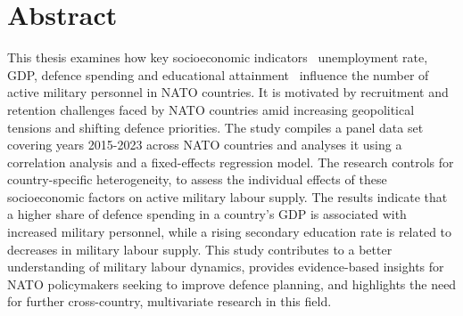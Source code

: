 \chapter*{Abstract}

This thesis examines how key socioeconomic indicators \textemdash\ unemployment rate, GDP, defence spending 
and educational attainment \textemdash\ influence the number of active military personnel in NATO countries.
It is motivated by recruitment and retention challenges faced by NATO countries
amid increasing geopolitical tensions and shifting defence priorities.
The study compiles a panel data set covering years 2015-2023 across NATO countries 
and analyses it using a correlation analysis and a 
fixed-effects regression model. The research controls for country-specific heterogeneity, to
assess the individual effects of these socioeconomic factors on active military labour supply.
The results indicate that a higher share of defence spending in a country's GDP is associated 
with increased military personnel, while a rising secondary education rate is related to decreases 
in military labour supply. 
This study contributes to a better understanding of military labour dynamics, 
provides evidence-based insights for NATO policymakers seeking to improve defence planning,
and highlights the need for further cross-country, 
multivariate research in this field.